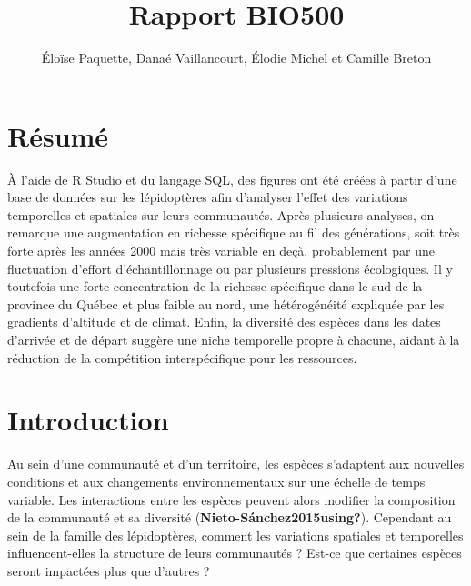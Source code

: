 \documentclass[9pt,twocolumn,twoside,]{pnas-new}
\title{Rapport BIO500}
\author[]{Éloïse Paquette, Danaé Vaillancourt, Élodie Michel et Camille
Breton}
\begin{document}
\verticaladjustment{-2pt}



\maketitle
\thispagestyle{firststyle}


\acknow{}

\section*{Résumé}\label{ruxe9sumuxe9}

À l'aide de R Studio et du langage SQL, des figures ont été créées à
partir d'une base de données sur les lépidoptères afin d'analyser
l'effet des variations temporelles et spatiales sur leurs communautés.
Après plusieurs analyses, on remarque une augmentation en richesse
spécifique au fil des générations, soit très forte après les années 2000
mais très variable en deçà, probablement par une fluctuation d'effort
d'échantillonnage ou par plusieurs pressions écologiques. Il y toutefois
une forte concentration de la richesse spécifique dans le sud de la
province du Québec et plus faible au nord, une hétérogénéité expliquée
par les gradients d'altitude et de climat. Enfin, la diversité des
espèces dans les dates d'arrivée et de départ suggère une niche
temporelle propre à chacune, aidant à la réduction de la compétition
interspécifique pour les ressources.

\section*{Introduction}\label{introduction}

Au sein d'une communauté et d'un territoire, les espèces s'adaptent aux
nouvelles conditions et aux changements environnementaux sur une échelle
de temps variable. Les interactions entre les espèces peuvent alors
modifier la composition de la communauté et sa diversité
(\textbf{Nieto-Sánchez2015using?}). Cependant au sein de la famille des
lépidoptères, comment les variations spatiales et temporelles
influencent-elles la structure de leurs communautés ? Est-ce que
certaines espèces seront impactées plus que d'autres ?
\end{document}
